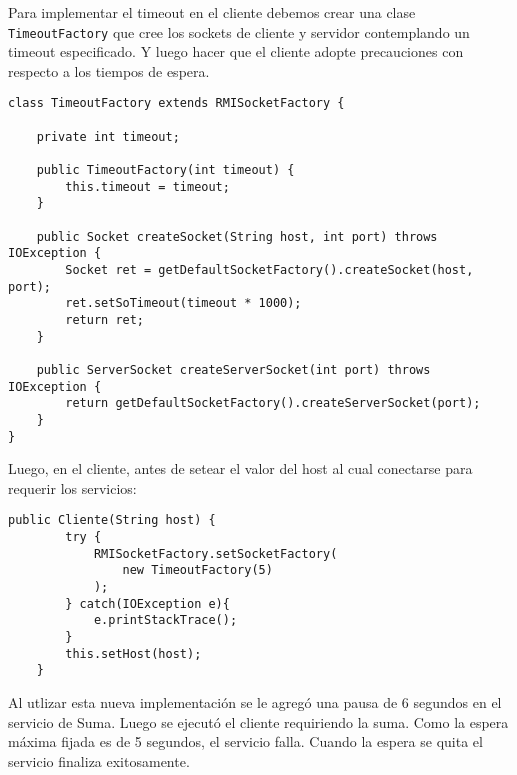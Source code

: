 Para implementar el timeout en el cliente debemos crear una clase \texttt{TimeoutFactory} que cree los sockets de cliente y servidor contemplando un timeout especificado. Y luego hacer que el cliente adopte precauciones con respecto a los tiempos de espera.

\begin{lstlisting}[title={Socket factory que contempla el \textbf{timeout} especificado}]
class TimeoutFactory extends RMISocketFactory {

    private int timeout;

    public TimeoutFactory(int timeout) {
        this.timeout = timeout;
    }

    public Socket createSocket(String host, int port) throws IOException {
        Socket ret = getDefaultSocketFactory().createSocket(host, port);
        ret.setSoTimeout(timeout * 1000);
        return ret;
    }

    public ServerSocket createServerSocket(int port) throws IOException {
        return getDefaultSocketFactory().createServerSocket(port);
    }
}
\end{lstlisting}

Luego, en el cliente, antes de setear el valor del host al cual conectarse para requerir los servicios:

\begin{lstlisting}[title={Utilizar la \texttt{TimeoutFactory} como default para la creación de sockets en el constructor de Cliente}]
    public Cliente(String host) {
        try {
            RMISocketFactory.setSocketFactory(
                new TimeoutFactory(5)
            );
        } catch(IOException e){
            e.printStackTrace();
        }
        this.setHost(host);
    }
\end{lstlisting}

Al utlizar esta nueva implementación se le agregó una pausa de 6 segundos en el servicio de Suma. Luego se ejecutó el cliente requiriendo la suma. Como la espera máxima fijada es de 5 segundos, el servicio falla. Cuando la espera se quita el servicio finaliza exitosamente.

\clearpage
\printbibliography



